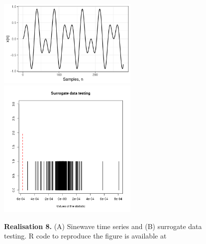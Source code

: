 \documentclass[11pt]{article}
\newcommand{\R}{\textsf{R}\xspace}
\newcommand{\codeicon}{{\color{linkcolor}\faFileCodeO}}
\newcommand{\codelink}[1]{\href{#1}{\codeicon}}
\begin{document}
\begin{figure}
\centering
\includegraphics[width=0.6\textwidth]{r8_ts_sinewaves_window_length_278} %
\includegraphics[width=0.6\textwidth]{r8_sdt_sinewaves_window_length_278} %
    \caption[]{
	{\bf Realisation 8.}
	(A) Sinewave time series and (B) surrogate data testing.
	\R code to reproduce the figure is available at 
	\codelink{https://github.com/mxochicale-phd/thesis/blob/master/0_code_data/1_code/x_surrogate/00_timeseries/code/B_.R}
	}
    \label{fig:thesis-outline}
\end{figure}
\end{document}
